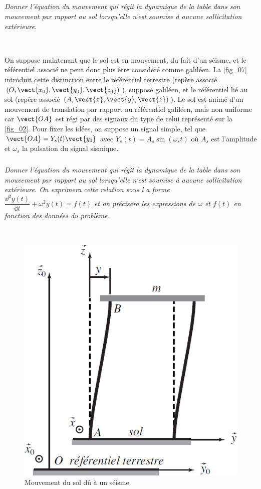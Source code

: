\documentclass[10pt,fleqn]{article} %
\begin{document}
\subparagraph{\label{q_02}}\textit{Donner l’équation du mouvement qui régit la dynamique de la table dans son mouvement par rapport au sol lorsqu’elle n’est soumise à aucune sollicitation extérieure.}
\ifprof
\begin{corrige} ~\\

\end{corrige}
\else
\fi

On suppose maintenant que le sol est en mouvement, du fait d’un séisme, et le référentiel associé ne peut
donc plus être considéré comme galiléen. La \autoref{fig_07} introduit cette distinction entre le référentiel terrestre
(repère associé $\left(O,\vect{x_0},\vect{y_0},\vect{z_0}\right)$), supposé galiléen, et le référentiel lié au sol (repère associé $\left(A,\vect{x},\vect{y},\vect{z}\right)$). Le sol
est animé d’un mouvement de translation par rapport au référentiel galiléen, mais non uniforme car $\vect{OA}$ est régi
par des signaux du type de celui représenté sur la \autoref{fig_02}.
Pour fixer les idées, on suppose un signal simple, tel que $\vect{OA}=Y_s(t)\vect{y_0}$ avec 
$Y_s (t) = A_s \sin\left(\omega_s t\right)$ où $A_s$ est
l’amplitude et $\omega_s$ la pulsation du signal sismique.

\subparagraph{\label{q_03}}\textit{Donner l’équation du mouvement qui régit la dynamique de la table dans son mouvement par rapport au sol lorsqu’elle n’est soumise à aucune sollicitation extérieure. On exprimera cette relation sous l a forme $\dfrac{\dd^2 y(t)}{\dd t}+\omega^2 y(t) = f(t)$ et on précisera les expressions de $\omega$ et $f(t)$ en fonction des données du problème.}
\ifprof
\begin{corrige} ~\\

\end{corrige}
\else
\fi


\begin{figure}[H]
\centering
\includegraphics[width=.5\linewidth]{fig_07}
\caption{Mouvement du sol dû à un séisme\label{fig_07}}
\end{figure}
\end{document}
